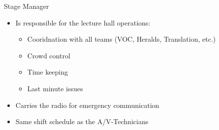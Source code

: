
\begin{frame}{Stage Manager}
	\begin{itemize}
		\item Is responsible for the lecture hall operations:
		\begin{itemize}
			\item Cooridnation with all teams (VOC, Heralds, Translation, etc.)
			\item Crowd control
			\item Time keeping
			\item Last minute issues
		\end{itemize}
		\item Carries the radio for emergency communication
		\item Same shift schedule as the A/V-Technicians
	\end{itemize}
\end{frame}
